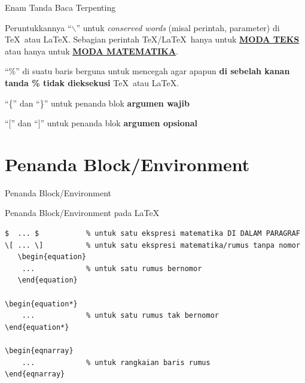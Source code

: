 \documentclass[11pt,            %
               aspectratio=169, %
               xcolor=svgnames,
               t                %
               ]{beamer}
\begin{document}
\begin{frame}
\begin{block}{Enam Tanda Baca Terpenting}
\bigskip

\centering{\hspace{0.2cm}$\backslash$\hfill\%\hfill\{\hfill\}\hfill\ [\hfill\ ]\hspace{0.2cm}}

\bigskip
\end{block}

\begin{block}{Peruntukkannya}
``$ \backslash $'' untuk \textit{conserved words} (misal perintah, parameter) di \TeX\ atau \LaTeX. Sebagian perintah \TeX/\LaTeX\ hanya untuk \textbf{\underline{MODA TEKS}} atau hanya untuk \textbf{\underline{MODA MATEMATIKA}}.

\bigskip

``\%'' di suatu baris berguna untuk mencegah agar apapun \textbf{di sebelah kanan tanda \% tidak dieksekusi} \TeX\ atau \LaTeX.

\bigskip

``\{'' dan ``\}'' untuk penanda blok \textbf{argumen wajib}

\bigskip

``['' dan ``]'' untuk penanda blok \textbf{argumen opsional}
\end{block}

\end{frame}

\section{Penanda Block/Environment}

\begin{frame}[containsverbatim]{Penanda Block/Environment}
\begin{block}{Penanda Block/Environment pada \LaTeX}
\begin{verbatim}
$  ... $           % untuk satu ekspresi matematika DI DALAM PARAGRAF
\[ ... \]          % untuk satu ekspresi matematika/rumus tanpa nomor
   \begin{equation}
    ...            % untuk satu rumus bernomor
   \end{equation}

\begin{equation*}
    ...            % untuk satu rumus tak bernomor
\end{equation*}

\begin{eqnarray}
    ...            % untuk rangkaian baris rumus
\end{eqnarray}
\end{verbatim}
\end{block}

\end{frame}
\end{document}
